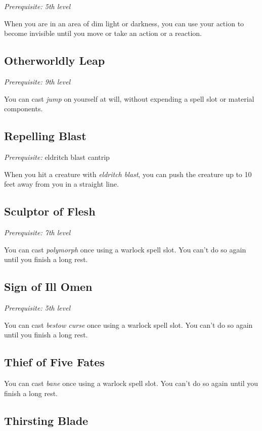 \textit{Prerequisite: 5th level}

When you are in an area of dim light or darkness, you can use your action to become invisible until you move or take an action or a reaction.

\subsection{Otherworldly Leap}

\textit{Prerequisite: 9th level}

You can cast \textit{jump} on yourself at will, without expending a spell slot or material components.

\subsection{Repelling Blast}

\textit{Prerequisite:} eldritch blast cantrip

When you hit a creature with \textit{eldritch blast}, you can push the creature up to 10 feet away from you in a straight line.

\subsection{Sculptor of Flesh}

\textit{Prerequisite: 7th level}

You can cast \textit{polymorph} once using a warlock spell slot. You can't do so again until you finish a long rest.

\subsection{Sign of Ill Omen}

\textit{Prerequisite: 5th level}

You can cast \textit{bestow curse} once using a warlock spell slot. You can't do so again until you finish a long rest.

\subsection{Thief of Five Fates}

You can cast \textit{bane} once using a warlock spell slot. You can't do so again until you finish a long rest.

\subsection{Thirsting Blade}

